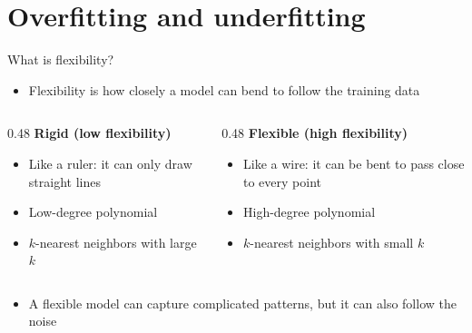 \section{Overfitting and underfitting}


\begin{frame}{What is flexibility?}
    \begin{itemize}
        \item Flexibility is how closely a model can bend to follow the training data
    \end{itemize}
    \begin{columns}[T]
        \begin{column}{0.48\textwidth}
            \textbf{Rigid (low flexibility)}
            \begin{itemize}
                \item Like a ruler: it can only draw straight lines
                \item Low-degree polynomial
                \item $k$-nearest neighbors with large $k$
            \end{itemize}
        \end{column}
        \begin{column}{0.48\textwidth}
            \textbf{Flexible (high flexibility)}
            \begin{itemize}
                \item Like a wire: it can be bent to pass close to every point
                \item High-degree polynomial
                \item $k$-nearest neighbors with small $k$
            \end{itemize}
        \end{column}
    \end{columns}
    \svspace{0.3em}
    \begin{itemize}
        \item A flexible model can capture complicated patterns, but it can also follow the noise
    \end{itemize}
\end{frame}


